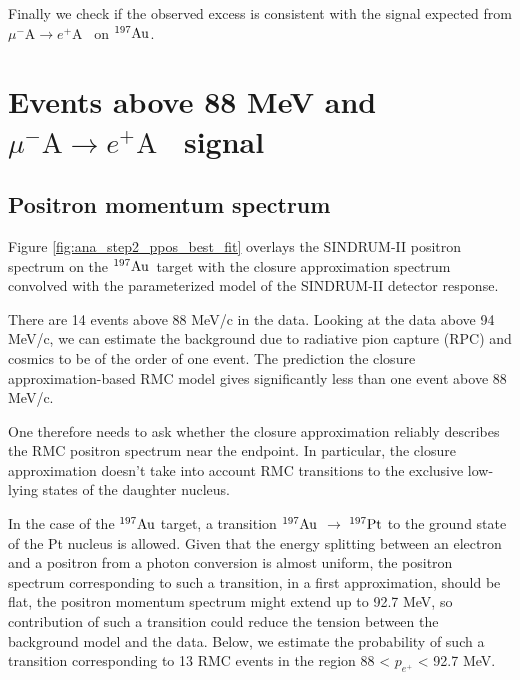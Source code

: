 \documentclass[12pt]{article}
\newcommand {\ra}        {\rightarrow}
\newcommand {\mumepconv}[1][A] {%
  \def\ArgI{{#1}}%
  \mumepconvRelay
}
\newcommand \mumepconvRelay[1][A]  {\mbox{$\mu^- \textrm{\ArgI} \rightarrow e^+ \textrm{#1}$}}
\newcommand {\Au}[1]     {\mbox{$\rm ^{#1}Au$}}                 %
\begin{document}
Finally we check if the observed excess is consistent with the signal expected from
\mumepconv\ on \Au{197}.










\newpage
\section {Events above 88 MeV and \mumepconv\ signal}
\subsection {Positron momentum spectrum}

Figure \ref{fig:ana_step2_ppos_best_fit} overlays the SINDRUM-II positron spectrum
on the \Au{197}\ target with the closure approximation spectrum convolved with the 
parameterized model of the SINDRUM-II detector response.

There are 14 events above 88 MeV/c in the data. Looking at the data above 94 MeV/c,
we can estimate the background due to radiative pion capture (RPC) and cosmics to be
of the order of one event. The prediction the closure approximation-based RMC model
gives significantly less than one event above 88 MeV/c. 

One therefore needs to ask whether the closure approximation reliably describes
the RMC positron spectrum near the endpoint. In particular, the closure approximation
doesn't take into account RMC transitions to the exclusive low-lying states of the 
daughter nucleus.

In the case of the \Au{197} target, a transition \Au{197} $\ra$ $^{197} \rm Pt$ to
the ground state of the Pt nucleus is allowed. Given that the energy splitting between
an electron and a positron from a photon conversion is almost uniform,
the positron spectrum corresponding to such a transition, in a first approximation,
should be flat, the positron momentum spectrum might extend up to 92.7 MeV, so contribution
of such a transition could reduce the tension between the background model and the data.
Below, we estimate the probability of such a transition corresponding to 13 RMC events
in the region 88 < $p_{e^+}$ < 92.7 MeV.
\end{document}
